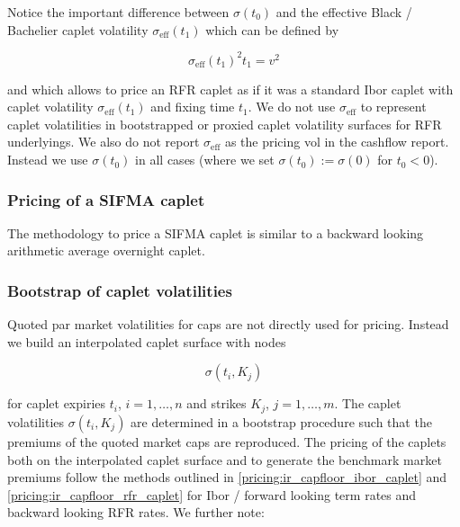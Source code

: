 Notice the important difference between $\sigma(t_0)$ and the effective Black / Bachelier caplet volatility
$\sigma_\text{eff}(t_1)$ which can be defined by

\begin{equation}\label{pricing:ir_capfloor_effvol}
\sigma_\text{eff}(t_1)^2 t_1 = v^2
\end{equation}

and which allows to price an RFR caplet as if it was a standard Ibor caplet with caplet volatility
$\sigma_\text{eff}(t_1)$ and fixing time $t_1$. We do not use $\sigma_\text{eff}$ to represent caplet volatilities in
bootstrapped or proxied caplet volatility surfaces for RFR underlyings. We also do not report $\sigma_\text{eff}$ as the
pricing vol in the cashflow report. Instead we use $\sigma(t_0)$ in all cases (where we set $\sigma(t_0) := \sigma(0)$
for $t_0 < 0$).

\subsubsection{Pricing of a SIFMA caplet}

The methodology to price a SIFMA caplet is similar to a backward looking arithmetic average overnight caplet.

\subsubsection{Bootstrap of caplet volatilities}
\label{pricing:ir_capfloor_bootstrap}

Quoted par market volatilities for caps are not directly used for pricing. Instead we build an interpolated caplet
surface with nodes

\begin{equation}
  \sigma(t_i, K_j)
\end{equation}

for caplet expiries $t_i$, $i=1,\ldots,n$ and strikes $K_j$, $j=1,\ldots,m$. The caplet volatilities $\sigma(t_i, K_j)$
are determined in a bootstrap procedure such that the premiums of the quoted market caps are reproduced. The pricing of
the caplets both on the interpolated caplet surface and to generate the benchmark market premiums follow the methods
outlined in \ref{pricing:ir_capfloor_ibor_caplet} and \ref{pricing:ir_capfloor_rfr_caplet} for Ibor / forward looking
term rates and backward looking RFR rates. We further note:

